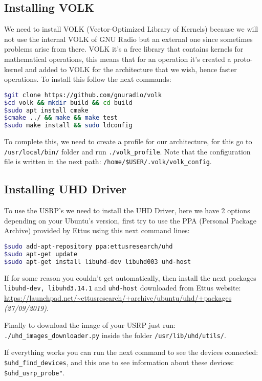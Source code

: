 \documentclass[a4paper, 10pt, conference]{ieeeconf}      %
\begin{document}
\subsection{Installing VOLK}
We need to install VOLK (Vector-Optimized Library of Kernels) because we will not use the internal VOLK of GNU Radio but an external one since sometimes problems arise from there. VOLK it's a free library that contains kernels for mathematical operations, this means that for an operation it's created a proto-kernel and added to VOLK for the architecture that we wish, hence faster operations. To install this follow the next commands:

\begin{lstlisting}[language=bash, breaklines]
$git clone https://github.com/gnuradio/volk
$cd volk && mkdir build && cd build
$sudo apt install cmake
$cmake ../ && make && make test
$sudo make install && sudo ldconfig
\end{lstlisting}

To complete this, we need to create a profile for our architecture, for this go to \verb|/usr/local/bin/| folder and run \verb|./volk_profile|. Note that the configuration file is written in the next path: \verb|/home/$USER/.volk/volk_config|.


\subsection{Installing UHD Driver}
To use the USRP's we need to install the UHD Driver, here we have 2 options depending on your Ubuntu's version, first try to use the PPA (Personal Package Archive) provided by Ettus using this next command lines:

\begin{lstlisting}[language=bash, breaklines]
$sudo add-apt-repository ppa:ettusresearch/uhd
$sudo apt-get update
$sudo apt-get install libuhd-dev libuhd003 uhd-host
\end{lstlisting}

If for some reason you couldn't get automatically, then install the next packages \verb|libuhd-dev, libuhd3.14.1| and \verb|uhd-host| downloaded from Ettus website: \url{https://launchpad.net/~ettusresearch/+archive/ubuntu/uhd/+packages} \textit{(27/09/2019)}.

Finally to download the image of your USRP just run: 
\verb|./uhd_images_downloader.py| inside the folder \verb|/usr/lib/uhd/utils/|.

If everything works you can run the next command to see the devices connected:
\verb|$uhd_find_devices|, and this one to see information about these devices: \verb|$uhd_usrp_probe"|.
\end{document}
